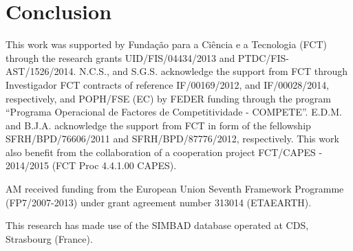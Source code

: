 \documentclass{aa}
\begin{document}
\section{Conclusion}
\label{sec:conclusion}












\begin{acknowledgements}

This work was supported by Funda\c{c}\~ao para a Ci\^encia e a Tecnologia (FCT)
through the research grants UID/FIS/04434/2013 and PTDC/FIS-AST/1526/2014.
N.C.S., and S.G.S. acknowledge the support from FCT through Investigador FCT
contracts of reference IF/00169/2012, and IF/00028/2014, respectively, and
POPH/FSE (EC) by FEDER funding through the program “Programa Operacional de
Factores de Competitividade - COMPETE”. E.D.M. and B.J.A. acknowledge the
support from FCT in form of the fellowship SFRH/BPD/76606/2011 and
SFRH/BPD/87776/2012, respectively. This work also benefit from the collaboration
of a cooperation project FCT/CAPES - 2014/2015 (FCT Proc 4.4.1.00 CAPES).

AM received funding from the European Union Seventh Framework Programme
(FP7/2007-2013) under grant agreement number 313014 (ETAEARTH).

This research has made use of the SIMBAD database operated at CDS, Strasbourg
(France).

\end{acknowledgements}





\clearpage
\appendix
\end{document}

